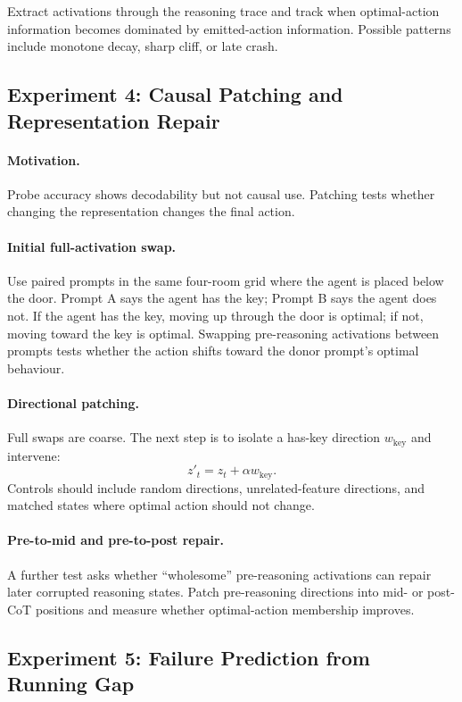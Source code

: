 \documentclass[11pt,a4paper]{article}
\begin{document}
Extract activations through the reasoning trace and track when optimal-action information becomes dominated by emitted-action information. Possible patterns include monotone decay, sharp cliff, or late crash.

\subsection{Experiment 4: Causal Patching and Representation Repair}

\paragraph{Motivation.} Probe accuracy shows decodability but not causal use. Patching tests whether changing the representation changes the final action.

\paragraph{Initial full-activation swap.} Use paired prompts in the same four-room grid where the agent is placed below the door. Prompt A says the agent has the key; Prompt B says the agent does not. If the agent has the key, moving up through the door is optimal; if not, moving toward the key is optimal. Swapping pre-reasoning activations between prompts tests whether the action shifts toward the donor prompt's optimal behaviour.

\paragraph{Directional patching.} Full swaps are coarse. The next step is to isolate a has-key direction $w_{\mathrm{key}}$ and intervene:
\[
z'_t=z_t+\alpha w_{\mathrm{key}}.
\]
Controls should include random directions, unrelated-feature directions, and matched states where optimal action should not change.

\paragraph{Pre-to-mid and pre-to-post repair.} A further test asks whether ``wholesome'' pre-reasoning activations can repair later corrupted reasoning states. Patch pre-reasoning directions into mid- or post-CoT positions and measure whether optimal-action membership improves.

\subsection{Experiment 5: Failure Prediction from Running Gap}
\end{document}
